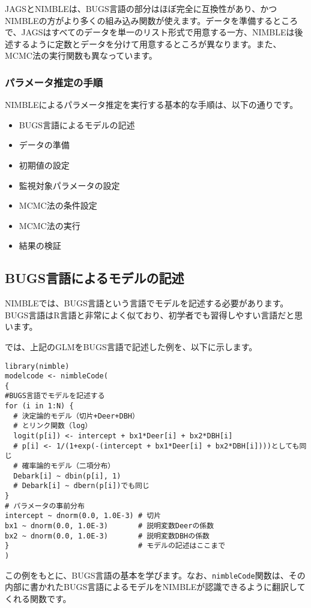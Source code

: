 JAGSとNIMBLEは、BUGS言語の部分はほぼ完全に互換性があり、かつNIMBLEの方がより多くの組み込み関数が使えます。データを準備するところで、JAGSはすべてのデータを単一のリスト形式で用意する一方、NIMBLEは後述するように定数とデータを分けて用意するところが異なります。また、MCMC法の実行関数も異なっています。

		\subsubsection{パラメータ推定の手順}
NIMBLEによるパラメータ推定を実行する基本的な手順は、以下の通りです。
\begin{itemize}
\item BUGS言語によるモデルの記述
\item データの準備
\item 初期値の設定
\item 監視対象パラメータの設定
\item MCMC法の条件設定
\item MCMC法の実行
\item 結果の検証
\end{itemize}

	\subsection{BUGS言語によるモデルの記述}
NIMBLEでは、BUGS言語という言語でモデルを記述する必要があります。BUGS言語はR言語と非常によく似ており、初学者でも習得しやすい言語だと思います。

では、上記のGLMをBUGS言語で記述した例を、以下に示します。

\clearpage
{}
\begin{verbatim}
library(nimble)
modelcode <- nimbleCode(
{
#BUGS言語でモデルを記述する
for (i in 1:N) {
  # 決定論的モデル（切片+Deer+DBH）
  # とリンク関数（log）
  logit(p[i]) <- intercept + bx1*Deer[i] + bx2*DBH[i]
  # p[i] <- 1/(1+exp(-(intercept + bx1*Deer[i] + bx2*DBH[i])))としても同じ
  # 確率論的モデル（二項分布）
  Debark[i] ~ dbin(p[i], 1)
  # Debark[i] ~ dbern(p[i])でも同じ
}
# パラメータの事前分布
intercept ~ dnorm(0.0, 1.0E-3) # 切片
bx1 ~ dnorm(0.0, 1.0E-3)       # 説明変数Deerの係数
bx2 ~ dnorm(0.0, 1.0E-3)       # 説明変数DBHの係数
}                              # モデルの記述はここまで
)
\end{verbatim}
この例をもとに、BUGS言語の基本を学びます。なお、\texttt{nimbleCode}関数は、その内部に書かれたBUGS言語によるモデルをNIMBLEが認識できるように翻訳してくれる関数です。

